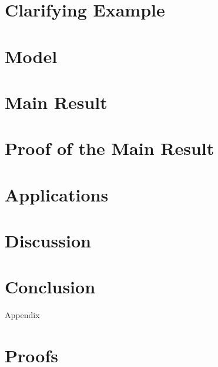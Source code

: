 \documentclass[12pt]{article}
\begin{document}
\section{Clarifying Example}
\label{sec:examples}


\section{Model}
\label{sec:model}


\section{Main Result}
\label{sec:main-result}


\section{Proof of the Main Result}
\label{sec:main-result-proof}


\section{Applications}
\label{sec:applications}




\section{Discussion}
\label{sec:discussion}



\section{Conclusion}
\label{sec:conclusion}


\printbibliography

\appendix
\newpage
\begin{center}
{\huge Appendix}{\huge\par}
\par\end{center}

\section{Proofs\label{sec:appendix-proofs}}

\end{document}
